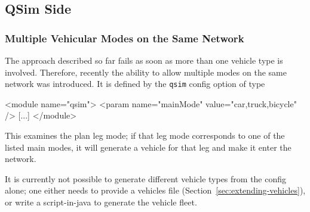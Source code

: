 \subsection{QSim Side}
\label{sec:using-qsim-multimodal}
\subsubsection{Multiple Vehicular Modes on the Same Network}



The approach described so far fails as soon as more than one vehicle type is involved. Therefore, recently the ability to allow multiple modes on the same network was introduced.  
It is defined by the \lstinline{qsim} config option of type
\begin{xml}
<module name="qsim">
   <param name="mainMode" value="car,truck,bicycle" />
   [...]
</module>
\end{xml}
This examines the plan leg mode; if that leg mode corresponds to one of the listed main modes, it will generate a vehicle for that leg and make it enter the network.

It is currently not possible to generate different vehicle types from the config alone; one either needs to provide a vehicles file (Section~\ref{sec:extending-vehicles}), or write a script-in-\gls{java} to generate the vehicle fleet.  


